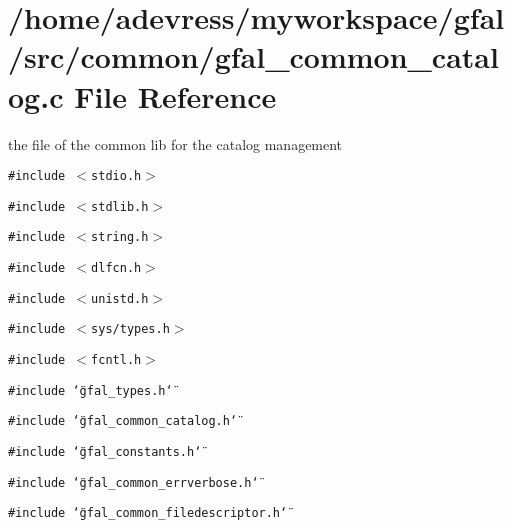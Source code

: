 \section{/home/adevress/myworkspace/gfal/src/common/gfal\_\-common\_\-catalog.c File Reference}
\label{gfal__common__catalog_8c}
the file of the common lib for the catalog management 

{\tt \#include $<$stdio.h$>$}\par
{\tt \#include $<$stdlib.h$>$}\par
{\tt \#include $<$string.h$>$}\par
{\tt \#include $<$dlfcn.h$>$}\par
{\tt \#include $<$unistd.h$>$}\par
{\tt \#include $<$sys/types.h$>$}\par
{\tt \#include $<$fcntl.h$>$}\par
{\tt \#include \char`\"{}gfal\_\-types.h\char`\"{}}\par
{\tt \#include \char`\"{}gfal\_\-common\_\-catalog.h\char`\"{}}\par
{\tt \#include \char`\"{}gfal\_\-constants.h\char`\"{}}\par
{\tt \#include \char`\"{}gfal\_\-common\_\-errverbose.h\char`\"{}}\par
{\tt \#include \char`\"{}gfal\_\-common\_\-filedescriptor.h\char`\"{}}\par
